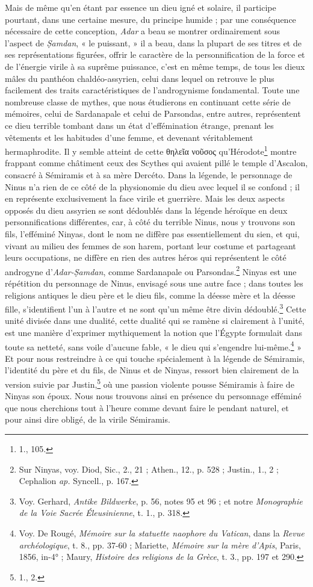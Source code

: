 \documentclass[a4paper, 11pt, oneside]{article}
\begin{document}
Mais de même qu'en étant par essence un dieu igné et solaire, il participe pourtant, dans une certaine mesure, du principe humide ; par une conséquence nécessaire de cette conception, \emph{Adar} a beau se montrer ordinairement sous l'aspect de \emph{\d{S}amdan}, « le puissant, » il a beau, dans la plupart de ses titres et de ses représentations figurées, offrir le caractère de la personnification de la force et de l'énergie virile à sa suprême puissance, c'est en même temps, de tous les dieux mâles du panthéon chaldéo-assyrien, celui dans lequel on retrouve le plus facilement des traits caractéristiques de l'androgynisme fondamental. Toute une nombreuse classe de mythes, que nous étudierons en continuant cette série de mémoires, celui de Sardanapale et celui de Parsondas, entre autres, représentent ce dieu terrible tombant dans un état d'effémination étrange, prenant les vêtements et les habitudes d'une femme, et devenant véritablement hermaphrodite. Il y semble atteint de cette θηλεῖα νοῦσος qu'Hérodote\footnote{1., 105.} montre frappant comme châtiment ceux des Scythes qui avaient pillé le temple d'Ascalon, consacré à Sémiramis et à sa mère Dercéto. Dans la légende, le personnage de Ninus n'a rien de ce côté de la physionomie du dieu avec lequel il se confond ; il en représente exclusivement la face virile et guerrière. Mais les deux aspects opposés du dieu assyrien se sont dédoublés dans la légende héroïque en deux personnifications différentes, car, à côté du terrible Ninus, nous y trouvons son fils, l'efféminé Ninyas, dont le nom ne diffère pas essentiellement du sien, et qui, vivant au milieu des femmes de son harem, portant leur costume et partageant leurs occupations, ne diffère en rien des autres héros qui représentent le côté androgyne d'\emph{Adar-\d{S}amdan}, comme Sardanapale ou Parsondas.\footnote{Sur Ninyas, voy. Diod, Sic., 2., 21 ; Athen., 12., p. 528 ; Justin., 1., 2 ; Cephalion \emph{ap.} Syncell., p. 167.} Ninyas est une répétition du personnage de Ninus, envisagé sous une autre face ; dans toutes les religions antiques le dieu père et le dieu fils, comme la déesse mère et la déesse fille, s'identifient l'un à l'autre et ne sont qu'un même être divin dédoublé.\footnote{Voy. Gerhard, \emph{Antike Bildwerke}, p. 56, notes 95 et 96 ; et notre \emph{Monographie de la Voie Sacrée Éleusinienne}, t. 1., p. 318.} Cette unité divisée dans une dualité, cette dualité qui se ramène si clairement à l'unité, est une manière d'exprimer mythiquement la notion que l'Égypte formulait dans toute sa netteté, sans voile d'aucune fable, « le dieu qui s'engendre lui-même.\footnote{Voy. De Rougé, \emph{Mémoire sur la statuette naophore du Vatican}, dans la \emph{Revue archéologique}, t. 8., pp. 37-60 ; Mariette, \emph{Mémoire sur la mère d'Apis}, Paris, 1856, in-4° ; Maury, \emph{Histoire des religions de la Grèce}, t. 3., pp. 197 et 290.} » Et pour nous restreindre à ce qui touche spécialement à la légende de Sémiramis, l'identité du père et du fils, de Ninus et de Ninyas, ressort bien clairement de la version suivie par Justin,\footnote{1., 2.} où une passion violente pousse Sémiramis à faire de Ninyas son époux. Nous nous trouvons ainsi en présence du personnage efféminé que nous cherchions tout à l'heure comme devant faire le pendant naturel, et pour ainsi dire obligé, de la virile Sémiramis.
\end{document}
